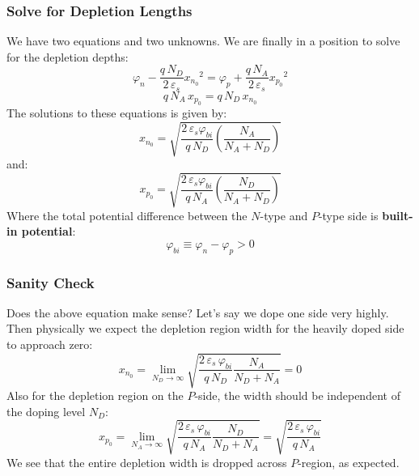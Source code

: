\subsubsection{Solve for Depletion Lengths}
We have two equations and two unknowns. We are finally in a position to solve for the depletion depths:
    \begin{equation} 
        \varphi_n - \frac{q\,N_D}{2\,\varepsilon_s}{x_{n_0}}^2 = \varphi_p + \frac{q\,N_A}{2\,\varepsilon_s}{x_{p_0}}^2 
    \end{equation}
    \begin{equation} 
        q\,N_A\,x_{p_0} = q\,N_D\,x_{n_0} 
    \end{equation}
The solutions to these equations is given by:
    \begin{equation} 
        x_{n_0} = \sqrt{\frac{2\,\varepsilon_s\varphi_{bi}}{q\,N_D} \left( {\frac{N_A}{N_A + N_D}}\right)} 
    \end{equation}
and:
    \begin{equation}
        x_{p_0} = \sqrt{\frac{2\,\varepsilon_s\varphi_{bi}}{q\,N_A} \left( {\frac{N_D}{N_A + N_D}}\right)} 
    \end{equation}
Where the total potential difference between the $N$-type and $P$-type side is \textbf{built-in potential}:
    \begin{equation}
        \varphi_{bi} \equiv \varphi_n - \varphi_p > 0 
    \end{equation}
\subsubsection{Sanity Check}
Does the above equation make sense?  Let's say we dope one side very highly. Then physically we expect the depletion region width for the heavily doped side to approach zero:
    \begin{equation} 
        x_{n_0} = \mathop{\lim}\limits_{{N_D} \to \infty}
                    \sqrt{\frac{2\,\varepsilon_s\,\varphi_{bi}}{q\,N_D} \frac{N_A}{N_D + N_A}} = 0 
    \end{equation}
Also for the depletion region on the $P$-side, the width should be independent of the doping level $N_D$:
    \begin{equation} 
        x_{p_0} = \mathop{\lim}\limits_{{N_A} \to \infty}
                    \sqrt{\frac{2\,\varepsilon_s\,\varphi_{bi}}{q\,N_A} \frac{N_D}{N_D + N_A}} = 
                    \sqrt{\frac{2\,\varepsilon_s\,\varphi_{bi}}{q\,N_A}}
    \end{equation}
We see that the entire depletion width is dropped across $P$-region, as expected.

